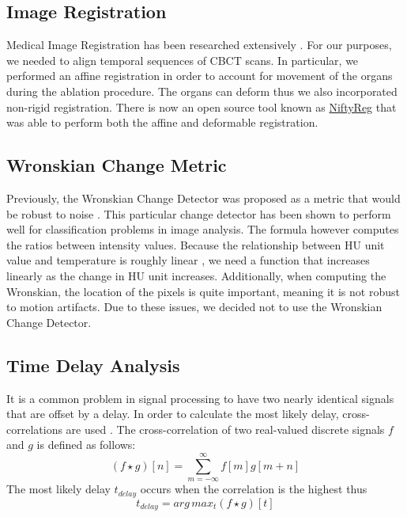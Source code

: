 \documentclass[]{spie}  %
\begin{document}
\subsection{Image Registration}

Medical Image Registration has been researched extensively \cite{Oliveira14, Hill01}. For our purposes, we needed to align temporal sequences of CBCT scans. In particular, we performed an affine registration in order to account for movement of the organs during the ablation procedure. The organs can deform thus we also incorporated non-rigid registration. There is now an open source tool known as \href{http://cmictig.cs.ucl.ac.uk/wiki/index.php/NiftyReg}{NiftyReg} \cite{Ourselin01,Modat10} that was able to perform both the affine \cite{Ourselin01} and deformable \cite{Modat10} registration.   

\subsection{Wronskian Change Metric}

Previously, the Wronskian Change Detector \cite{Durucan01} was proposed as a metric that would be robust to noise \cite{Li13}. This particular change detector has been shown to perform well for classification problems \cite{Panda13,Durucan01,Ang11,Subudhi13} in image analysis. The formula however computes the ratios between intensity values. Because the relationship between HU unit value and temperature is roughly linear \cite{Fani14}, we need a function that increases linearly as the change in HU unit increases. Additionally, when computing the Wronskian, the location of the pixels is quite important, meaning it is not robust to motion artifacts. Due to these issues, we decided not to use the Wronskian Change Detector. 

\subsection{Time Delay Analysis}

It is a common problem in signal processing to have two nearly identical signals that are offset by a delay. In order to calculate the most likely delay, cross-correlations are used \cite{Rhudy09}. The cross-correlation of two real-valued discrete signals $f$ and $g$ is defined as follows:
\[
(f \star g)[n] = \sum_{m=-\infty}^{\infty}{f[m]g[m+n]}
\]
The most likely delay $t_{delay}$ occurs when the correlation is the highest thus
\[
t_{delay} = arg\,max_t (f \star g)[t]
\]
\end{document}
